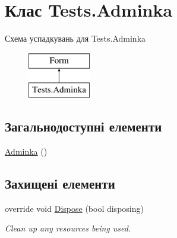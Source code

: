 \hypertarget{class_tests_1_1_adminka}{}\section{Клас Tests.\+Adminka}
\label{class_tests_1_1_adminka}
Схема успадкувань для Tests.\+Adminka\begin{figure}[H]
\begin{center}
\leavevmode
\includegraphics[height=2.000000cm]{class_tests_1_1_adminka}
\end{center}
\end{figure}
\subsection*{Загальнодоступні елементи}
\begin{DoxyCompactItemize}
\item 
\hyperlink{class_tests_1_1_adminka_afe133ffb1d1a8906368ca768606e6b72}{Adminka} ()
\end{DoxyCompactItemize}
\subsection*{Захищені елементи}
\begin{DoxyCompactItemize}
\item 
override void \hyperlink{class_tests_1_1_adminka_ad10de447810a69558e83dcdb58681510}{Dispose} (bool disposing)
\begin{DoxyCompactList}\small\item\em Clean up any resources being used. \end{DoxyCompactList}\end{DoxyCompactItemize}
